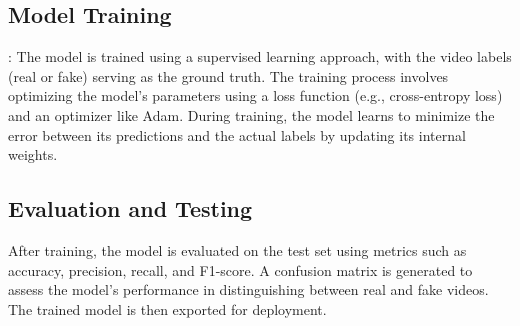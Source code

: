 \subsection{Model Training}: The model is trained using a supervised learning approach, with the video labels (real or fake) serving as the ground truth. The training process involves optimizing the model's parameters using a loss function (e.g., cross-entropy loss) and an optimizer like Adam. During training, the model learns to minimize the error between its predictions and the actual labels by updating its internal weights.
\subsection{Evaluation and Testing}
After training, the model is evaluated on the test set using metrics such as accuracy, precision, recall, and F1-score. A confusion matrix is generated to assess the model’s performance in distinguishing between real and fake videos. The trained model is then exported for deployment.